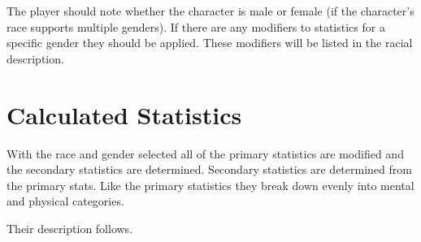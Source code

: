 The player should note whether the character is male or
female (if the character's race supports multiple genders). If there are
any modifiers to statistics for a specific gender they should be applied.
These modifiers will be listed in the racial description.

\section{Calculated Statistics}

With the race and gender selected all of the primary statistics are modified 
and the secondary statistics are determined. Secondary statistics are 
determined from the primary stats. Like the primary statistics they break 
down evenly into mental and physical categories.

Their description follows.

